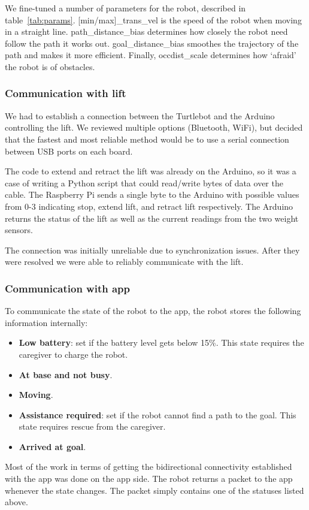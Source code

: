 \documentclass{article}
\begin{document}
We fine-tuned a number of parameters for the robot, described in table~\ref{tab:params}. [min/max]\_trans\_vel is the speed of the robot when moving in a straight line. path\_distance\_bias determines how closely the robot need follow the path it works out. goal\_distance\_bias smoothes the trajectory of the path and makes it more efficient. Finally, occdist\_scale determines how `afraid' the robot is of obstacles. 

\subsubsection{Communication with lift}
We had to establish a connection between the Turtlebot and the Arduino controlling the lift. We reviewed multiple options (Bluetooth, WiFi), but decided that the fastest and most reliable method would be to use a serial connection between USB ports on each board.

The code to extend and retract the lift was already on the Arduino, so it was a case of writing a Python script that could read/write bytes of data over the cable. The Raspberry Pi sends a single byte to the Arduino with possible values from 0-3 indicating stop, extend lift, and retract lift respectively. The Arduino returns the status of the lift as well as the current readings from the two weight sensors.

The connection was initially unreliable due to synchronization issues. After they were resolved we were able to reliably communicate with the lift.

\subsubsection{Communication with app}
To communicate the state of the robot to the app, the robot stores the following information internally:
\begin{itemize}
\item {\bf Low battery}: set if the battery level gets below 15\%. This state requires the caregiver to charge the robot. 
\item {\bf At base and not busy}. 
\item {\bf Moving}.
\item {\bf Assistance required}: set if the robot cannot find a path to the goal. This state requires rescue from the caregiver. 
\item {\bf Arrived at goal}.
\end{itemize}

Most of the work in terms of getting the bidirectional connectivity established with the app was done on the app side. The robot returns a packet to the app whenever the state changes. The packet simply contains one of the statuses listed above.
\end{document}
